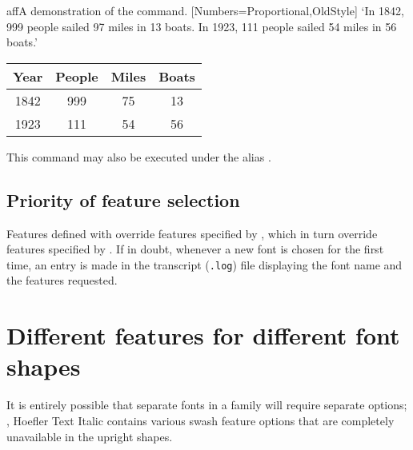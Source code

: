 \begin{Lexample}{aff}{A demonstration of the  command.}
           [Numbers={Proportional,OldStyle}]
  `In 1842, 999 people sailed 97 miles in
   13 boats. In 1923, 111 people sailed 54
   miles in 56 boats.'            \bigskip

  {
  \begin{tabular}{@{} cccc @{}}
            Year & People & Miles & Boats \\
    \hline  1842 &  999   &  75   &  13   \\
            1923 &  111   &  54   &  56
  \end{tabular}}
\end{Lexample}

\DescribeMacro{\addfontfeature}
This command may also be executed under the alias \cmd{\addfontfeature}.


\subsection{Priority of feature selection}
Features defined with  override features
specified by , which in turn override features
specified by .  If in doubt, whenever a
new font is chosen for the first time, an entry is made in the
transcript (\texttt{.log}) file displaying the font name and the
features requested.


\section{Different features for different font shapes}
\label{sec:bfit-feat}


It is entirely possible that separate fonts in a family will require
separate options; \eg, Hoefler Text Italic contains various swash
feature options that are completely unavailable in the upright shapes.

